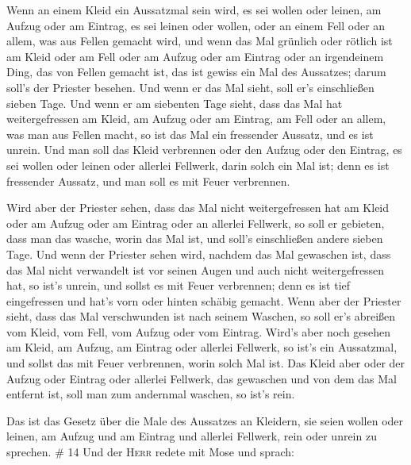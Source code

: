  Wenn an einem Kleid ein Aussatzmal sein wird, es sei
wollen oder leinen,  am Aufzug oder am Eintrag, es sei
leinen oder wollen, oder an einem Fell oder an allem, was aus Fellen
gemacht wird,  und wenn das Mal grünlich oder rötlich ist
am Kleid oder am Fell oder am Aufzug oder am Eintrag oder an irgendeinem
Ding, das von Fellen gemacht ist, das ist gewiss ein Mal des Aussatzes;
darum soll's der Priester besehen.  Und wenn er das Mal
sieht, soll er's einschließen sieben Tage.  Und wenn er
am siebenten Tage sieht, dass das Mal hat weitergefressen am Kleid, am
Aufzug oder am Eintrag, am Fell oder an allem, was man aus Fellen macht,
so ist das Mal ein fressender Aussatz, und es ist unrein.
 Und man soll das Kleid verbrennen oder den Aufzug oder
den Eintrag, es sei wollen oder leinen oder allerlei Fellwerk, darin
solch ein Mal ist; denn es ist fressender Aussatz, und man soll es mit
Feuer verbrennen.

 Wird aber der Priester sehen, dass das Mal nicht
weitergefressen hat am Kleid oder am Aufzug oder am Eintrag oder an
allerlei Fellwerk,  so soll er gebieten, dass man das
wasche, worin das Mal ist, und soll's einschließen andere sieben Tage.
 Und wenn der Priester sehen wird, nachdem das Mal
gewaschen ist, dass das Mal nicht verwandelt ist vor seinen Augen und
auch nicht weitergefressen hat, so ist's unrein, und sollst es mit Feuer
verbrennen; denn es ist tief eingefressen und hat's vorn oder hinten
schäbig gemacht.  Wenn aber der Priester sieht, dass das
Mal verschwunden ist nach seinem Waschen, so soll er's abreißen vom
Kleid, vom Fell, vom Aufzug oder vom Eintrag.  Wird's
aber noch gesehen am Kleid, am Aufzug, am Eintrag oder allerlei
Fellwerk, so ist's ein Aussatzmal, und sollst das mit Feuer verbrennen,
worin solch Mal ist.  Das Kleid aber oder der Aufzug oder
Eintrag oder allerlei Fellwerk, das gewaschen und von dem das Mal
entfernt ist, soll man zum andernmal waschen, so ist's rein.

 Das ist das Gesetz über die Male des Aussatzes an
Kleidern, sie seien wollen oder leinen, am Aufzug und am Eintrag und
allerlei Fellwerk, rein oder unrein zu sprechen. \# 14 
Und der \textsc{Herr} redete mit Mose und sprach:

